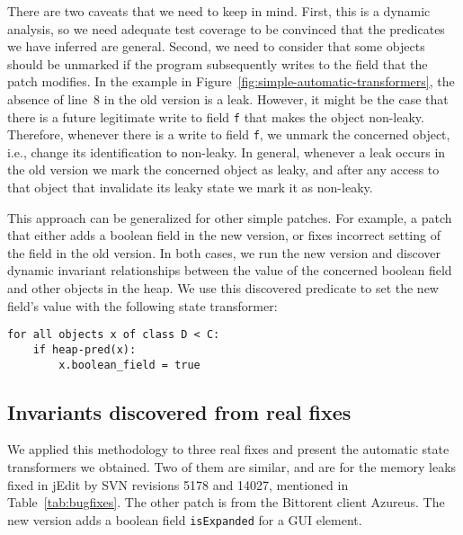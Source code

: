 There are two caveats that we need to keep in mind. First, this is a
dynamic analysis, so we need adequate test coverage to be convinced that
the predicates we have inferred are general. Second, we need to consider
that some objects should be unmarked
if the program subsequently writes to the field that the patch modifies.
In the example in
Figure~\ref{fig:simple-automatic-transformers}, the absence of line~8 in
the old version is a leak. However, it might be the case that there is a
future legitimate write to field {\tt f} that makes the object non-leaky.
Therefore, whenever there is a write to field {\tt f}, we unmark the
concerned object, i.e., change its identification to non-leaky.
%
In general, whenever a leak occurs in the old version we mark the concerned
object as leaky, and after any access to that object that invalidate its
leaky state we mark it as non-leaky.

This approach can be generalized for other simple patches.
For example, a patch that either adds a boolean field in the new version,
or fixes incorrect setting of the field in the old version. In both cases,
we run the new version and discover dynamic invariant relationships between
the value of the concerned boolean field and other objects in the heap. We
use this discovered predicate to set the new field's value with the
following state transformer:

\begin{center}
\begin{minipage}{0.53\textwidth}
\begin{lstlisting}[frame=single]
for all objects x of class D < C:
    if heap-pred(x):
        x.boolean_field = true
\end{lstlisting}
\end{minipage}
\end{center}

\subsection{Invariants discovered from real fixes}
We applied this methodology to three real fixes and present the
automatic state transformers we obtained. Two of them are similar, and are for
the memory leaks fixed in jEdit by SVN revisions 5178 and 14027, mentioned
in Table~\ref{tab:bugfixes}. The other patch is from the Bittorent client
Azureus. The new version adds a boolean field {\tt isExpanded} for a GUI
element.

